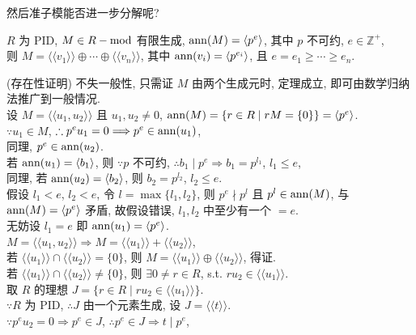 \documentclass{note}
\begin{document}
然后准子模能否进一步分解呢?

\begin{thm}[(课本定理 6.11)]\label{thm-6.11}
    $R$ 为 PID, $M\in R-\operatorname{mod}$ 有限生成, $\operatorname{ann}(M)=\langle p^e\rangle$, 其中 $p$ 不可约, $e\in\mathbb{Z}^+$,\\
    则 $M=\langle\langle v_1\rangle\rangle\oplus\cdots\oplus\langle\langle v_n\rangle\rangle$, 其中 $\operatorname{ann}(v_i)=\langle p^{e_i}\rangle$, 且 $e=e_1\geq\cdots\geq e_n$.
\end{thm}
\begin{pf}(存在性证明)
    不失一般性, 只需证 $M$ 由两个生成元时, 定理成立, 即可由数学归纳法推广到一般情况.\\
    设 $M=\langle\langle u_1,u_2\rangle\rangle$ 且 $u_1,u_2\neq 0$, $\operatorname{ann}(M)=\{r\in R\mid rM=\{0\}\}=\langle p^e\rangle$.\\
    $\because u_1\in M$, $\therefore p^eu_1=0\Longrightarrow p^e\in\operatorname{ann}(u_1)$,\\
    同理, $p^e\in\operatorname{ann}(u_2)$.\\
    若 $\operatorname{ann}(u_1)=\langle b_1\rangle$, 则 $\because p$ 不可约, $\therefore b_1\mid p^e\Longrightarrow b_1=p^{l_1}$, $l_1\leq e$,\\
    同理, 若 $\operatorname{ann}(u_2)=\langle b_2\rangle$, 则 $b_2=p^{l_2}$, $l_2\leq e$.\\
    假设 $l_1<e$, $l_2<e$, 令 $l=\max\{l_1,l_2\}$, 则 $p^e\nmid p^l$ 且 $p^l\in\operatorname{ann}(M)$, 与 $\operatorname{ann}(M)=\langle p^e\rangle$ 矛盾, 故假设错误, $l_1,l_2$ 中至少有一个 $=e$.\\
    无妨设 $l_1=e$ 即 $\operatorname{ann}(u_1)=\langle p^e\rangle$.\\
    $M=\langle\langle u_1,u_2\rangle\rangle\Longrightarrow M=\langle\langle u_1\rangle\rangle+\langle\langle u_2\rangle\rangle$,\\
    若 $\langle\langle u_1\rangle\rangle\cap\langle\langle u_2\rangle\rangle=\{0\}$, 则 $M=\langle\langle u_1\rangle\rangle\oplus\langle\langle u_2\rangle\rangle$, 得证.\\
    若 $\langle\langle u_1\rangle\rangle\cap\langle\langle u_2\rangle\rangle\neq\{0\}$, 则 $\exists 0\neq r\in R$, s.t. $ru_2\in\langle\langle u_1\rangle\rangle$.\\
    取 $R$ 的理想 $J=\{r\in R\mid ru_2\in\langle\langle u_1\rangle\rangle\}$.\\
    $\because R$ 为 PID, $\therefore J$ 由一个元素生成, 设 $J=\langle\langle t\rangle\rangle$.\\
    $\because p^eu_2=0\Longrightarrow p^e\in J$, $\therefore p^e\in J\Longrightarrow t\mid p^e$,\\

\end{pf}
\end{document}
